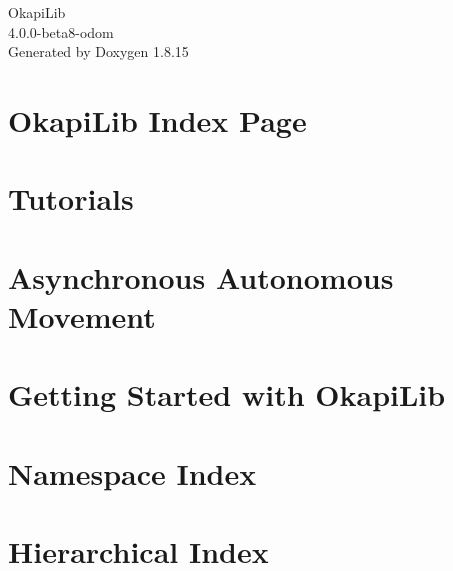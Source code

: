 \let\mypdfximage\pdfximage\def\pdfximage{\immediate\mypdfximage}\documentclass[twoside]{book}
\newcommand{\+}{\discretionary{\mbox{\scriptsize$\hookleftarrow$}}{}{}}
\newcommand{\clearemptydoublepage}{%
  \newpage{\pagestyle{empty}\cleardoublepage}%
}
\begin{document}
\hypersetup{pageanchor=false,
             bookmarksnumbered=true,
             pdfencoding=unicode
            }
\begin{titlepage}
\vspace*{7cm}
\begin{center}%
{\Large Okapi\+Lib \\[1ex]\large 4.\+0.\+0-\/beta8-\/odom }\\
\vspace*{1cm}
{\large Generated by Doxygen 1.8.15}\\
\end{center}
\end{titlepage}
\clearemptydoublepage
{}
\tableofcontents
\clearemptydoublepage
{}
\hypersetup{pageanchor=true}

\chapter{Okapi\+Lib Index Page}
\label{index}\hypertarget{index}{}
\chapter{Tutorials}
\label{md_docs_tutorials_index}

\chapter{Asynchronous Autonomous Movement}
\label{md_docs_tutorials_walkthrough_asyncAutonomousMovement}

\chapter{Getting Started with Okapi\+Lib}
\label{md_docs_tutorials_walkthrough_gettingStarted}

\chapter{Namespace Index}

\chapter{Hierarchical Index}

\end{document}
